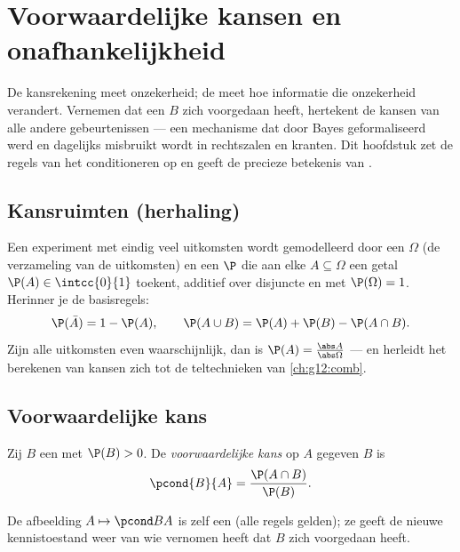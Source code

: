 \chapter{Voorwaardelijke kansen en onafhankelijkheid}\label{ch:g12:condprob}

De kansrekening meet onzekerheid; de  meet hoe informatie
die onzekerheid verandert. Vernemen dat een  $B$ zich voorgedaan
heeft, hertekent de kansen van alle andere gebeurtenissen --- een mechanisme
dat door Bayes geformaliseerd werd en dagelijks misbruikt wordt in
rechtszalen en kranten. Dit hoofdstuk zet de regels van het conditioneren op
en geeft de precieze betekenis van .

\section{Kansruimten (herhaling)}

Een experiment met eindig veel uitkomsten wordt gemodelleerd door een
\emph{} $\Omega$ (de verzameling van de uitkomsten) en
een  $\P$ die aan elke  $A \subseteq \Omega$ een getal
$\P(A) \in \intcc{0}{1}$ toekent, additief over disjuncte  en met
$\P(\Omega) = 1$. Herinner je de basisregels:
\[
\P(\bar A) = 1 - \P(A),
\qquad
\P(A \cup B) = \P(A) + \P(B) - \P(A \cap B).
\]
Zijn alle uitkomsten even waarschijnlijk, dan is
$\P(A) = \frac{\abs A}{\abs\Omega}$ --- en herleidt het berekenen van kansen
zich tot de teltechnieken van \cref{ch:g12:comb}.

\section{Voorwaardelijke kans}

\begin{definition}\label{def:g12:condprob:cond}
Zij $B$ een  met $\P(B) > 0$. De \emph{voorwaardelijke
kans} op $A$ gegeven $B$ is
\[
\pcond{B}{A} = \frac{\P(A \cap B)}{\P(B)} .
\]
\end{definition}

De afbeelding $A \mapsto \pcond BA$ is zelf een  (alle regels gelden); ze
geeft de nieuwe kennistoestand weer van wie vernomen heeft dat $B$ zich
voorgedaan heeft.

